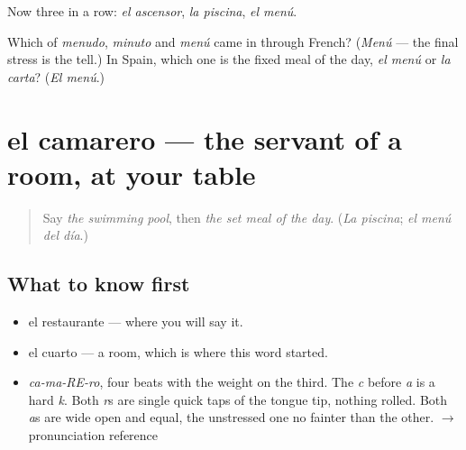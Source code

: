 Now three in a row: \emph{el ascensor}, \emph{la piscina}, \emph{el menú}.

\begin{tcolorbox}[breakable,colback=teal!4,colframe=teal!35!black,title={Before you move on}]
Which of \emph{menudo}, \emph{minuto} and \emph{menú} came in through French? (\emph{Menú} — the final stress is the tell.) In Spain, which one is the fixed meal of the day, \emph{el menú} or \emph{la carta}? (\emph{El menú}.)
\end{tcolorbox}
\section[el camarero]{el camarero — the servant of a room, at your table}

\label{lesson:ES-C391-camarero}



\begin{quote}
Say \emph{the swimming pool}, then \emph{the set meal of the day}. (\emph{La piscina}; \emph{el menú del día}.)
\end{quote}

\subsection*{What to know first}
\begin{itemize}
\raggedright
  \item el restaurante — where you will say it.
  \item el cuarto — a room, which is where this word started.
\end{itemize}

\begin{sounds}
\begin{itemize}
\raggedright
  \item \emph{ca-ma-RE-ro}, four beats with the weight on the third. The \emph{c} before \emph{a} is a hard \emph{k}. Both \emph{r}s are single quick taps of the tongue tip, nothing rolled. Both \emph{a}s are wide open and equal, the unstressed one no fainter than the other. $\to$ pronunciation reference
\end{itemize}
\end{sounds}

